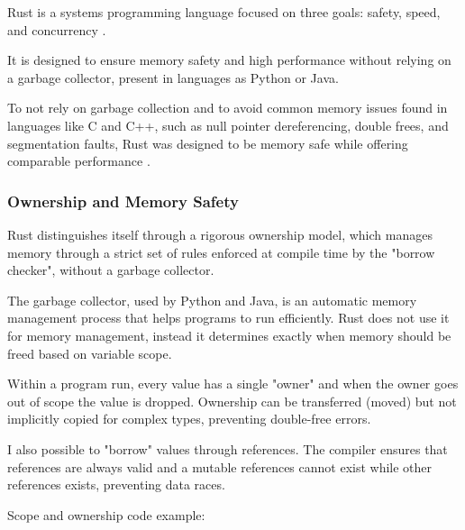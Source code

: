 Rust is a systems programming language focused on three goals: safety, speed, and concurrency \parencite{RustProgrammingLanguage}.

It is designed to ensure memory safety and high performance without relying on a garbage collector, present in languages as
Python or Java.

To not rely on garbage collection and to avoid common memory issues found in languages like C and C++, 
such as null pointer dereferencing, double frees, and segmentation faults, 
Rust was designed to be memory safe while offering comparable performance \parencite{RustCppProgrammers}.

\subsubsection{Ownership and Memory Safety}
Rust distinguishes itself through a rigorous ownership model, 
which manages memory through a strict set of rules enforced at compile time by the "borrow checker", 
without a garbage collector. \parencite{ProgrammingRust}

The garbage collector, used by Python and Java, is an automatic memory management process that helps programs to run efficiently.
Rust does not use it for memory management, instead it determines exactly when memory should be freed based on variable scope. \parencite{ProgrammingRust}

Within a program run, every value has a single "owner" and when the owner goes out of scope the value is dropped. 
Ownership can be transferred (moved) but not implicitly copied for complex types, preventing double-free errors. \parencite{ProgrammingRust}

I also possible to "borrow" values through references. 
The compiler ensures that references are always valid and a mutable references cannot exist while other references exists, 
preventing data races. \parencite{RustCppProgrammers}

Scope and ownership code example:

